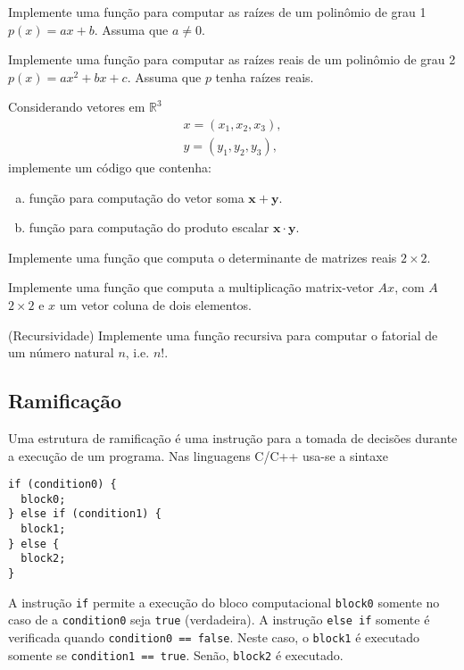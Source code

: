\documentclass[12pt]{article}
\begin{document}
\begin{exr}
  Implemente uma função para computar as raízes de um polinômio de grau 1 $p(x) = ax + b$. Assuma que $a\neq 0$.
\end{exr}

\begin{exr}
  Implemente uma função para computar as raízes reais de um polinômio de grau 2 $p(x) = ax^2 + bx + c$. Assuma que $p$ tenha raízes reais.
\end{exr}

\begin{exr}
  Considerando vetores em $\mathbb{R}^3$
  \begin{gather}
    x = (x_1, x_2, x_3),\\
    y = (y_1, y_2, y_3),
  \end{gather}
  implemente um código que contenha:
  \begin{enumerate}[a)]
  \item função para computação do vetor soma $\pmb{x}+\pmb{y}$.
  \item função para computação do produto escalar $\pmb{x}\cdot\pmb{y}$.
  \end{enumerate}
\end{exr}

\begin{exr}
  Implemente uma função que computa o determinante de matrizes reais $2\times 2$. 
\end{exr}

\begin{exr}
  Implemente uma função que computa a multiplicação matrix-vetor $Ax$, com $A$ $2\times 2$ e $x$ um vetor coluna de dois elementos.
\end{exr}

\begin{exr}(Recursividade) Implemente uma função recursiva para computar o fatorial de um número natural $n$, i.e. $n!$.  
\end{exr}

\subsection{Ramificação}

Uma estrutura de ramificação é uma instrução para a tomada de decisões durante a execução de um programa. Nas linguagens C/C++ usa-se a sintaxe
\begin{lstlisting}
if (condition0) {
  block0;
} else if (condition1) {
  block1;
} else {
  block2;
}
\end{lstlisting}
A instrução \lstinline+if+ permite a execução do bloco computacional \lstinline+block0+ somente no caso de a \lstinline+condition0+ seja \lstinline+true+ (verdadeira). A instrução \lstinline+else if+ somente é verificada quando \lstinline+condition0 == false+. Neste caso, o \lstinline+block1+ é executado somente se \lstinline+condition1 == true+. Senão, \lstinline+block2+ é executado.
\end{document}
